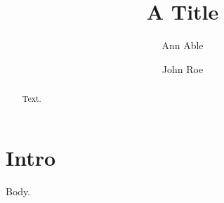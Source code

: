 \documentclass{aastex701}
\begin{document}
\title{A Title}
\author{Ann Able}
\author{John Roe}
\begin{abstract}
Text.
\end{abstract}
\section{Intro} Body.
\end{document}
